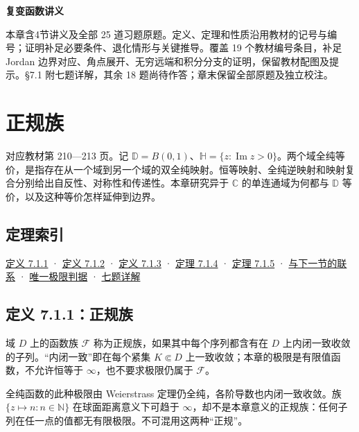 \documentclass[11pt,a4paper]{article}
\begin{document}
\begin{center}
{\LARGE\bfseries 复变函数讲义\par}
\vspace{8pt}{\large 第七章\quad 共形映射\par}
\vspace{6pt}{\small 依史济怀、刘太顺《复变函数》\quad 教材第 210—234 页\par}
\end{center}\vspace{8pt}
本章含4节讲义及全部 25 道习题原题。定义、定理和性质沿用教材的记号与编号；证明补足必要条件、退化情形与关键推导。覆盖 19 个教材编号条目，补足 Jordan 边界对应、角点展开、无穷远端和积分分支的证明，保留教材配图及提示。§7.1 附七题详解，其余 18 题尚待作答；章末保留全部原题及独立校注。
\begingroup\setlength{\parskip}{0pt}\tableofcontents\endgroup\clearpage
\section{正规族}
对应教材第 210---213 页。记
\(\mathbb D=B(0,1)\)、\(\mathbb H=\{z:\operatorname{Im}z>0\}\)。两个域全纯等价，是指存在从一个域到另一个域的双全纯映射。恒等映射、全纯逆映射和映射复合分别给出自反性、对称性和传递性。本章研究异于
\(\mathbb C\) 的单连通域为何都与 \(\mathbb D\)
等价，以及这种等价怎样延伸到边界。

\subsection*{定理索引}\label{ch07-s1-heading-1}

\hyperref[ch07-s1-heading-2]{定义 7.1.1} · \hyperref[ch07-s1-heading-3]{定义 7.1.2} ·
\hyperref[ch07-s1-heading-4]{定义 7.1.3} · \hyperref[ch07-s1-heading-5]{定理 7.1.4} ·
\hyperref[ch07-s1-heading-6]{定理 7.1.5} · \hyperref[ch07-s1-heading-7]{与下一节的联系}
· \hyperref[ch07-s1-heading-8]{唯一极限判据} · \hyperref[ch07-s1-heading-9]{七题详解}

\subsection{定义 7.1.1：正规族}\label{ch07-s1-heading-2}

域 \(D\) 上的函数族 \(\mathcal F\) 称为正规族，如果其中每个序列都含有在
\(D\) 上内闭一致收敛的子列。``内闭一致''即在每个紧集 \(K\Subset D\)
上一致收敛；本章的极限是有限值函数，不允许恒等于
\(\infty\)，也不要求极限仍属于 \(\mathcal F\)。

全纯函数的此种极限由 Weierstrass 定理仍全纯，各阶导数也内闭一致收敛。族
\(\{z\mapsto n:n\in\mathbb N\}\) 在球面距离意义下可趋于
\(\infty\)，却不是本章意义的正规族：任何子列在任一点的值都无有限极限。不可混用这两种``正规''。
\end{document}
